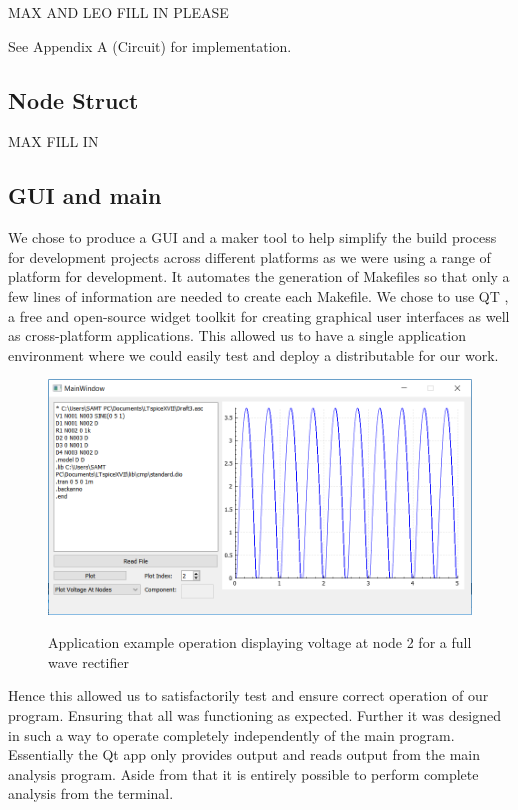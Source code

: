 \documentclass{article}
\begin{document}
MAX AND LEO FILL IN PLEASE

\bigbreak
See Appendix A (Circuit) for implementation.
\subsection{Node Struct}
MAX FILL IN
\newpage
\subsection{GUI and main}
We chose to produce a GUI and a maker tool to help simplify the build process for development projects across different platforms as we were using a range of platform for development. It automates the generation of Makefiles so that only a few lines of information are needed to create each Makefile. We chose to use QT , a free and open-source widget toolkit for creating graphical user interfaces as well as cross-platform applications. This allowed us to have a single application environment where we could easily test and deploy a distributable for our work.
\bigbreak
\begin{figure}[h]
    \caption{Application example operation displaying voltage at node 2 for a full wave rectifier}
    \centering
    \includegraphics[width=1\textwidth]{images/AppEx.PNG}
    \label{fig:AppEx}
\end{figure}
Hence this allowed us to satisfactorily test and ensure correct operation of our program. Ensuring that all was functioning as expected. Further it was designed in such a way to operate completely independently of the main program. Essentially the Qt app only provides output and reads output from the main analysis program. Aside from that it is entirely possible to perform complete analysis from the terminal.


\newpage
\end{document}
